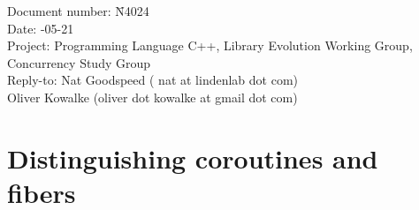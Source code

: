 \documentclass[a4paper,10pt,DIV15]{scrartcl}
\begin{document}
\small
\begin{tabbing}
    Document number: \= N4024\\
    Date:            -05-21 \\
    Project:         \> Programming Language C++, Library Evolution Working Group, Concurrency Study Group\\
    Reply-to:        \> Nat Goodspeed ( nat at lindenlab dot com)\\
                     \> Oliver Kowalke (oliver dot kowalke at gmail dot com)\\
\end{tabbing}

\section*{Distinguishing coroutines and fibers}


\tableofcontents












\end{document}

